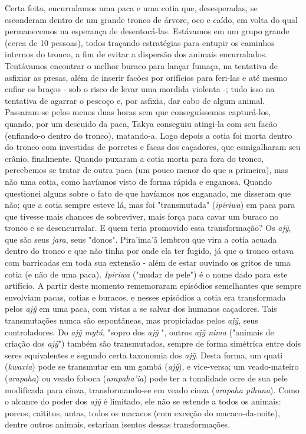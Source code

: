 Certa feita, encurralamos uma paca e uma cotia que, desesperadas, se
esconderam dentro de um grande tronco de árvore, oco e caído, em volta
do qual permanecemos na esperança de desentocá-las. Estávamos em um
grupo grande (cerca de 10 pessoas), todos traçando estratégias para
entupir os caminhos internos do tronco, a fim de evitar a dispersão dos
animais encurralados. Tentávamos encontrar o melhor buraco para lançar
fumaça, na tentativa de asfixiar as presas, além de inserir facões por
orifícios para feri-las e até mesmo enfiar os braços - sob o risco de
levar uma mordida violenta -; tudo isso na tentativa de agarrar o
pescoço e, por asfixia, dar cabo de algum animal. Passaram-se pelos
menos duas horas sem que conseguíssemos capturá-los, quando, por um
descuido da paca, Takya conseguiu atingi-la com seu facão (enfiando-o
dentro do tronco), matando-a. Logo depois a cotia foi morta dentro do
tronco com investidas de porretes e facas dos caçadores, que
esmigalharam seu crânio, finalmente. Quando puxaram a cotia morta para
fora do tronco, percebemos se tratar de outra paca (um pouco menor do
que a primeira), mas não uma cotia, como havíamos visto de forma rápida
e enganosa. Quando questionei alguns sobre o fato de que havíamos nos
enganado, me disseram que não; que a cotia sempre esteve lá, mas foi
"transmutada" (\emph{ipiriwa}) em paca para que tivesse mais chances de
sobreviver, mais força para cavar um buraco no tronco e se
desencurralar. E quem teria promovido essa transformação? Os \emph{ajỹ},
que são seus \emph{jara}, seus "donos". Pira'ima'ã lembrou que vira a
cotia acuada dentro do tronco e que não tinha por onde ela ter fugido,
já que o tronco estava com barricadas em toda sua extensão - além de
estar ouvindo os gritos de uma cotia (e não de uma paca). \emph{Ipiriwa}
("mudar de pele") é o nome dado para este artifício. A partir deste
momento rememoraram episódios semelhantes que sempre envolviam pacas,
cotias e buracos, e nesses episódios a cotia era transformada pelos
\emph{ajỹ} em uma paca, com vistas a se salvar dos humanos caçadores.
Tais transmutações nunca são espontâneas, mas propiciadas pelos
\emph{ajỹ}, seus controladores. Do \emph{ajỹ mytú}, "sopro dos
\emph{ajỹ} ", outros \emph{ajỹ nima} ("animais de criação dos
\emph{ajỹ}") também são transmutados, sempre de forma simétrica entre
dois seres equivalentes e segundo certa taxonomia dos \emph{ajỹ}. Desta
forma, um quati (\emph{kwaxia}) pode se transmutar em um gambá
(\emph{ajỹ}), e vice-versa; um veado-mateiro (\emph{arapaha}) ou veado
foboca (\emph{arapaha'ia}) pode ter a tonalidade ocre de sua pele
modificada para cinza, transformando-se em veado cinza (\emph{arapaha
pihuna}). Como o alcance do poder dos \emph{ajỹ} é limitado, ele não se
estende a todos os animais: porcos, caititus, antas, todos os macacos
(com exceção do macaco-da-noite), dentre outros animais, estariam
isentos dessas transformações.

